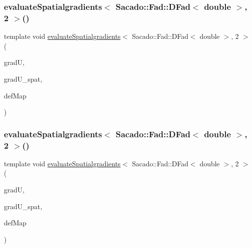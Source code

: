 \subsubsection{\texorpdfstring{evaluate\+Spatialgradients$<$ Sacado\+::\+Fad\+::\+D\+Fad$<$ double $>$, 2 $>$()}{evaluateSpatialgradients< Sacado::Fad::DFad< double >, 2 >()}\hspace{0.1cm}{\footnotesize\ttfamily [1/2]}}
{\footnotesize\ttfamily template void \mbox{\hyperlink{group___evaluation_functions_ga0b976342d491f6215953e2e65ea6a0de}{evaluate\+Spatialgradients}}$<$ Sacado\+::\+Fad\+::\+D\+Fad$<$ double $>$, 2 $>$ (\begin{DoxyParamCaption}\item[{Table$<$ 2, Sacado\+::\+Fad\+::\+D\+Fad$<$ double $>$$>$ \&}]{gradU,  }\item[{Table$<$ 2, Sacado\+::\+Fad\+::\+D\+Fad$<$ double $>$$>$}]{grad\+U\+\_\+spat,  }\item[{\mbox{\hyperlink{structdeformation_map}{deformation\+Map}}$<$ Sacado\+::\+Fad\+::\+D\+Fad$<$ double $>$, 2 $>$ \&}]{def\+Map }\end{DoxyParamCaption})}

\mbox{\label{function_evaluations_8cc_ab89d365bd9b7a2124796e27f59a3b190}} 
\subsubsection{\texorpdfstring{evaluate\+Spatialgradients$<$ Sacado\+::\+Fad\+::\+D\+Fad$<$ double $>$, 2 $>$()}{evaluateSpatialgradients< Sacado::Fad::DFad< double >, 2 >()}\hspace{0.1cm}{\footnotesize\ttfamily [2/2]}}
{\footnotesize\ttfamily template void \mbox{\hyperlink{group___evaluation_functions_ga0b976342d491f6215953e2e65ea6a0de}{evaluate\+Spatialgradients}}$<$ Sacado\+::\+Fad\+::\+D\+Fad$<$ double $>$, 2 $>$ (\begin{DoxyParamCaption}\item[{Table$<$ 3, Sacado\+::\+Fad\+::\+D\+Fad$<$ double $>$$>$ \&}]{gradU,  }\item[{Table$<$ 3, Sacado\+::\+Fad\+::\+D\+Fad$<$ double $>$$>$}]{grad\+U\+\_\+spat,  }\item[{\mbox{\hyperlink{structdeformation_map}{deformation\+Map}}$<$ Sacado\+::\+Fad\+::\+D\+Fad$<$ double $>$, 2 $>$ \&}]{def\+Map }\end{DoxyParamCaption})}

